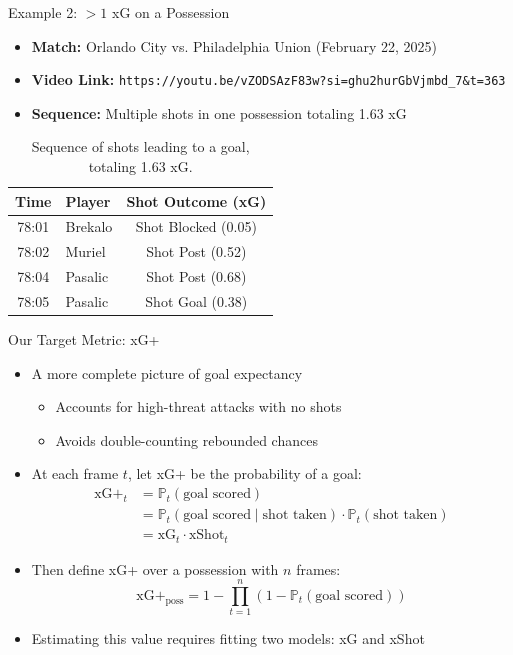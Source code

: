 \documentclass{beamer}
\begin{document}
\begin{frame}[fragile]{Example 2: $>1$ xG on a Possession}
\begin{itemize}
\item \textbf{Match:} Orlando City vs. Philadelphia Union (February 22, 2025)
\item \textbf{Video Link:} \verb|https://youtu.be/vZODSAzF83w?si=ghu2hurGbVjmbd_7&t=363|
\item \textbf{Sequence:} Multiple shots in one possession totaling 1.63 xG
\end{itemize}

\begin{table}[h]
\centering
\begin{tabular}{|c|l|c|}
\hline
\textbf{Time} & \textbf{Player} & \textbf{Shot Outcome (xG)} \\
\hline
78:01 & Brekalo & Shot Blocked (0.05) \\
78:02 & Muriel & Shot Post (0.52) \\
78:04 & Pasalic & Shot Post (0.68) \\
78:05 & Pasalic & Shot Goal (0.38) \\
\hline
\end{tabular}
\caption{Sequence of shots leading to a goal, totaling 1.63 xG.}
\end{table}
\end{frame}

\begin{frame}{Our Target Metric: xG+}
\begin{itemize}
\item A more complete picture of goal expectancy
  \begin{itemize}
  \item Accounts for high-threat attacks with no shots
  \item Avoids double-counting rebounded chances
  \end{itemize}
\item At each frame $t$, let xG+ be the probability of a goal:
\begin{align*}
\text{xG+}_t &= \mathbb{P}_t(\text{goal scored}) \\
&= \mathbb{P}_t(\text{goal scored} \mid \text{shot taken})\cdot\mathbb{P}_t(\text{shot taken}) \\
&= \text{xG}_t\cdot\text{xShot}_t
\end{align*}
\item Then define xG+ over a possession with $n$ frames:
$$\text{xG+}_\text{poss} = 1 - \prod_{t = 1}^n \left(1 - \mathbb{P}_t\left(\text{goal scored}\right)\right)$$
\item Estimating this value requires fitting two models: xG and xShot
\end{itemize}
\end{frame}
\end{document}
